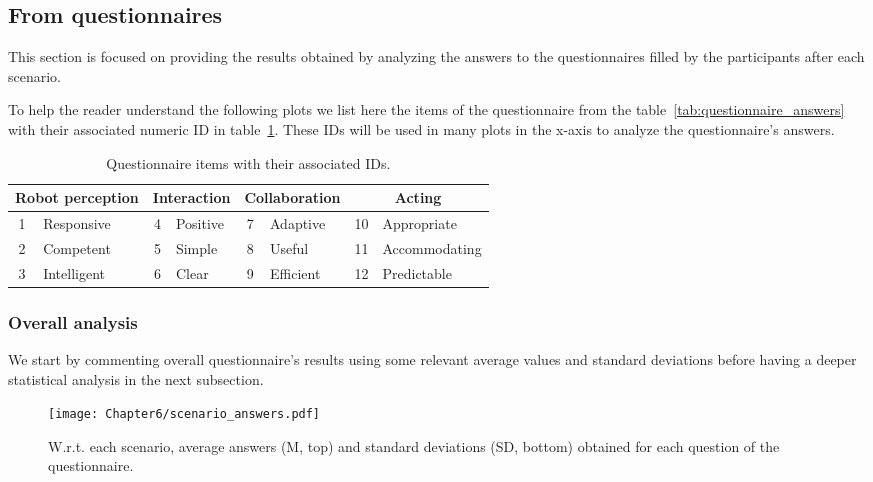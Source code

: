 \subsection{From questionnaires}

This section is focused on providing the results obtained by analyzing the answers to the questionnaires filled by the participants after each scenario.

To help the reader understand the following plots we list here the items of the questionnaire from the table~\ref{tab:questionnaire_answers} with their associated numeric ID in table~\ref{tab:items_id}. These IDs will be used in many plots in the x-axis to analyze the questionnaire's answers.

\begin{table}[h]
    \center
    \begin{tabular}{|cl|cl|cl|cl|}
    \hline
    \multicolumn{2}{|c|}{\textbf{Robot perception}} & \multicolumn{2}{c|}{\textbf{Interaction}} & \multicolumn{2}{c|}{\textbf{Collaboration}} & \multicolumn{2}{c|}{\textbf{Acting}} \\ \hline
    1                 & Responsive                  & 4                & Positive               & 7                & Adaptive                 & 10          & Appropriate            \\ \hline
    2                 & Competent                   & 5                & Simple                 & 8                & Useful                   & 11          & Accommodating          \\ \hline
    3                 & Intelligent                 & 6                & Clear                  & 9                & Efficient                & 12          & Predictable            \\ \hline
    \end{tabular}
    \caption{Questionnaire items with their associated IDs.}
    \label{tab:items_id}
    \end{table}


\subsubsection{Overall analysis}

We start by commenting overall questionnaire's results using some relevant average values and standard deviations before having a deeper statistical analysis in the next subsection.

\begin{figure}[h]
    \center
    \texttt{[image: Chapter6/scenario\_answers.pdf]}
    \caption{W.r.t. each scenario, average answers (M, top) and standard deviations (SD, bottom) obtained for each question of the questionnaire.}
    \label{fig:scenario_answers}
\end{figure}

